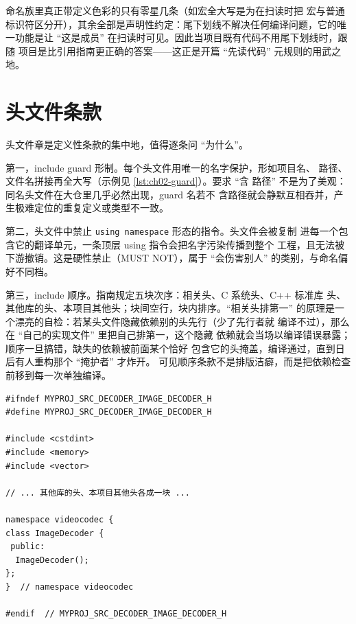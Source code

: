 \documentclass[12pt,a4paper,fontset=fandol]{ctexbook}
\newcommand{\Tp}[1]{\texttt{#1}}
\begin{document}
\begin{note}[title={读命名条款的正确姿势}]
命名族里真正带定义色彩的只有零星几条（如宏全大写是为在扫读时把
宏与普通标识符区分开），其余全部是声明性约定：尾下划线不解决任何编译问题，它的唯一功能是让
``这是成员'' 在扫读时可见。因此当项目既有代码不用尾下划线时，跟随
项目是比引用指南更正确的答案——这正是开篇 ``先读代码'' 元规则的用武之地。
\end{note}

\section{头文件条款}
\label{sec:ch02-headers}

头文件章是定义性条款的集中地，值得逐条问 ``为什么''。

第一，include guard 形制。每个头文件用唯一的名字保护，形如项目名、
路径、文件名拼接再全大写（示例见 \ref{lst:ch02-guard}）。要求 ``含
路径'' 不是为了美观：同名头文件在大仓里几乎必然出现，guard 名若不
含路径就会静默互相吞并，产生极难定位的重复定义或类型不一致。

第二，头文件中禁止 \Tp{using namespace} 形态的指令。头文件会被复制
进每一个包含它的翻译单元，一条顶层 using 指令会把名字污染传播到整个
工程，且无法被下游撤销。这是硬性禁止（MUST NOT），属于 ``会伤害别人''
的类别，与命名偏好不同档。

第三，include 顺序。指南规定五块次序：相关头、C 系统头、C++ 标准库
头、其他库的头、本项目其他头；块间空行，块内排序。``相关头排第一''
的原理是一个漂亮的自检：若某头文件隐藏依赖别的头先行（少了先行者就
编译不过），那么在 ``自己的实现文件'' 里把自己排第一，这个隐藏
依赖就会当场以编译错误暴露；顺序一旦搞错，缺失的依赖被前面某个恰好
包含它的头掩盖，编译通过，直到日后有人重构那个 ``掩护者'' 才炸开。
可见顺序条款不是排版洁癖，而是把依赖检查前移到每一次单独编译。

\begin{lstlisting}[style=cppstyle,caption={guard 形制与 include 顺序},label={lst:ch02-guard}]
#ifndef MYPROJ_SRC_DECODER_IMAGE_DECODER_H
#define MYPROJ_SRC_DECODER_IMAGE_DECODER_H

#include <cstdint>
#include <memory>
#include <vector>

// ... 其他库的头、本项目其他头各成一块 ...

namespace videocodec {
class ImageDecoder {
 public:
  ImageDecoder();
};
}  // namespace videocodec

#endif  // MYPROJ_SRC_DECODER_IMAGE_DECODER_H
\end{lstlisting}
\end{document}
